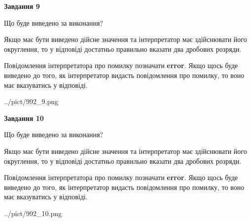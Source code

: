 \documentclass[12pt, ukrainian]{article}
\begin{document}
{\begin {Large}
{\begin {center}\textbf{Завдання 9}\end {center}}\par
Що буде виведено за виконання? \par

Якщо має бути виведено дійсне значення та інтерпретатор має здійснювати його округлення, 
то у відповіді достатньо правильно вказати два дробових розряди.

Повідомлення інтерпретатора про помилку позначати \textbf{error}.
Якщо щось буде виведено до того, як інтерпретатор видасть повідомлення про помилку, 
то воно має вказуватись у відповіді. \par

\begin{center}
	{../pict/992_9.png}
\end{center}
\newpage

{\begin {center}\textbf{Завдання 10}\end {center}}\par
Що буде виведено за виконання? \par

Якщо має бути виведено дійсне значення та інтерпретатор має здійснювати його округлення, 
то у відповіді достатньо правильно вказати два дробових розряди.

Повідомлення інтерпретатора про помилку позначати \textbf{error}.
Якщо щось буде виведено до того, як інтерпретатор видасть повідомлення про помилку, 
то воно має вказуватись у відповіді. \par

\begin{center}
	{../pict/992_10.png}
\end{center}
\newpage

\end {Large}}
\end{document}
